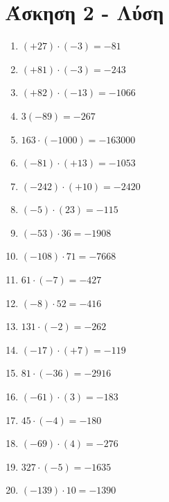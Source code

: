 \documentclass[a4paper,10pt]{report}
\begin{document}
\section*{Άσκηση 2 - Λύση\hfill \small{}}
\begin{enumerate}[1)]
 \item $(+27)\cdot(-3)=-81$
 \item $(+81)\cdot(-3)=-243$
 \item $(+82)\cdot(-13)=-1066$
 \item $3(-89)=-267$
 \item $163\cdot(-1000)=-163000$
 \item $(-81)\cdot(+13)=-1053$
 \item $(-242)\cdot(+10)=-2420$
 \item $(-5)\cdot(23)=-115$
 \item $(-53)\cdot36=-1908$
 \item $(-108)\cdot71=-7668$
 \item $61\cdot(-7)=-427$
 \item $(-8)\cdot52=-416$
 \item $131\cdot(-2)=-262$
 \item $(-17)\cdot(+7)=-119$
 \item $81\cdot(-36)=-2916$
 \item $(-61)\cdot(3)=-183$
 \item $45\cdot(-4)=-180$
 \item $(-69)\cdot(4)=-276$
 \item $327\cdot(-5)=-1635$
 \item $(-139)\cdot10=-1390$
\end{enumerate}






\end{document}
